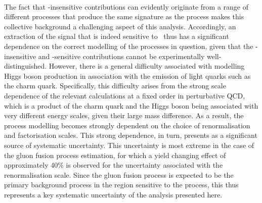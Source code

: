 \\
The fact that \kappac-insensitive \cHZZ contributions can evidently originate from a range of different processes that produce the same signature as the \cHZZsen process makes this collective background a challenging aspect of this analysis. Accordingly, an extraction of the signal that is indeed sensitive to \kappac\, thus has a significant dependence on the correct modelling of the processes in question, given that the \kappac-insensitive and \kappac-sensitive \cHZZ contributions cannot be experimentally well-distinguished. However, there is a general difficulty associated with modelling Higgs boson production in association with the emission of light quarks such as the charm quark. Specifically, this difficulty arises from the strong scale dependence of the relevant calculations at a fixed order in perturbative QCD, which is a product of the charm quark and the Higgs boson being associated with very different energy scales, given their large mass difference. As a result, the process modelling becomes strongly dependent on the choice of renormalisation and factorisation scales. This strong dependence, in turn, presents as a significant source of systematic uncertainty. This uncertainty is most extreme in the case of the gluon fusion process estimation, for which a yield changing effect of approximately 40\% is observed for the uncertainty associated with the renormalisation scale. Since the gluon fusion process is expected to be the primary background process in the region sensitive to the \cHZZsen process, this thus represents a key systematic uncertainty of the analysis presented here. 
